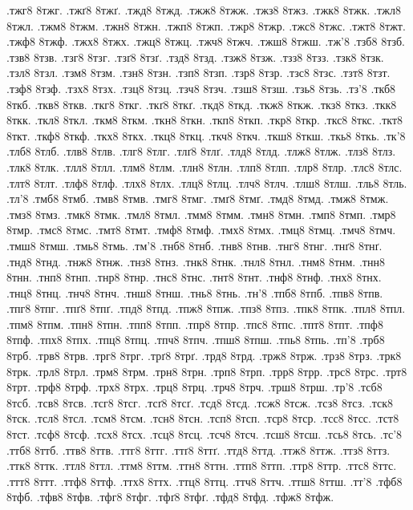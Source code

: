 {.тжг8 8тжг.
.тжґ8 8тжґ.
.тжд8 8тжд.
.тжж8 8тжж.
.тжз8 8тжз.
.тжк8 8тжк.
.тжл8 8тжл.
.тжм8 8тжм.
.тжн8 8тжн.
.тжп8 8тжп.
.тжр8 8тжр.
.тжс8 8тжс.
.тжт8 8тжт.
.тжф8 8тжф.
.тжх8 8тжх.
.тжц8 8тжц.
.тжч8 8тжч.
.тжш8 8тжш.
.тж'8
.тзб8 8тзб.
.тзв8 8тзв.
.тзг8 8тзг.
.тзґ8 8тзґ.
.тзд8 8тзд.
.тзж8 8тзж.
.тзз8 8тзз.
.тзк8 8тзк.
.тзл8 8тзл.
.тзм8 8тзм.
.тзн8 8тзн.
.тзп8 8тзп.
.тзр8 8тзр.
.тзс8 8тзс.
.тзт8 8тзт.
.тзф8 8тзф.
.тзх8 8тзх.
.тзц8 8тзц.
.тзч8 8тзч.
.тзш8 8тзш.
.тзь8 8тзь.
.тз'8
.ткб8 8ткб.
.ткв8 8ткв.
.ткг8 8ткг.
.ткґ8 8ткґ.
.ткд8 8ткд.
.ткж8 8ткж.
.ткз8 8ткз.
.ткк8 8ткк.
.ткл8 8ткл.
.ткм8 8ткм.
.ткн8 8ткн.
.ткп8 8ткп.
.ткр8 8ткр.
.ткс8 8ткс.
.ткт8 8ткт.
.ткф8 8ткф.
.ткх8 8ткх.
.ткц8 8ткц.
.ткч8 8ткч.
.ткш8 8ткш.
.ткь8 8ткь.
.тк'8
.тлб8 8тлб.
.тлв8 8тлв.
.тлг8 8тлг.
.тлґ8 8тлґ.
.тлд8 8тлд.
.тлж8 8тлж.
.тлз8 8тлз.
.тлк8 8тлк.
.тлл8 8тлл.
.тлм8 8тлм.
.тлн8 8тлн.
.тлп8 8тлп.
.тлр8 8тлр.
.тлс8 8тлс.
.тлт8 8тлт.
.тлф8 8тлф.
.тлх8 8тлх.
.тлц8 8тлц.
.тлч8 8тлч.
.тлш8 8тлш.
.тль8 8тль.
.тл'8
.тмб8 8тмб.
.тмв8 8тмв.
.тмг8 8тмг.
.тмґ8 8тмґ.
.тмд8 8тмд.
.тмж8 8тмж.
.тмз8 8тмз.
.тмк8 8тмк.
.тмл8 8тмл.
.тмм8 8тмм.
.тмн8 8тмн.
.тмп8 8тмп.
.тмр8 8тмр.
.тмс8 8тмс.
.тмт8 8тмт.
.тмф8 8тмф.
.тмх8 8тмх.
.тмц8 8тмц.
.тмч8 8тмч.
.тмш8 8тмш.
.тмь8 8тмь.
.тм'8
.тнб8 8тнб.
.тнв8 8тнв.
.тнг8 8тнг.
.тнґ8 8тнґ.
.тнд8 8тнд.
.тнж8 8тнж.
.тнз8 8тнз.
.тнк8 8тнк.
.тнл8 8тнл.
.тнм8 8тнм.
.тнн8 8тнн.
.тнп8 8тнп.
.тнр8 8тнр.
.тнс8 8тнс.
.тнт8 8тнт.
.тнф8 8тнф.
.тнх8 8тнх.
.тнц8 8тнц.
.тнч8 8тнч.
.тнш8 8тнш.
.тнь8 8тнь.
.тн'8
.тпб8 8тпб.
.тпв8 8тпв.
.тпг8 8тпг.
.тпґ8 8тпґ.
.тпд8 8тпд.
.тпж8 8тпж.
.тпз8 8тпз.
.тпк8 8тпк.
.тпл8 8тпл.
.тпм8 8тпм.
.тпн8 8тпн.
.тпп8 8тпп.
.тпр8 8тпр.
.тпс8 8тпс.
.тпт8 8тпт.
.тпф8 8тпф.
.тпх8 8тпх.
.тпц8 8тпц.
.тпч8 8тпч.
.тпш8 8тпш.
.тпь8 8тпь.
.тп'8
.трб8 8трб.
.трв8 8трв.
.трг8 8трг.
.трґ8 8трґ.
.трд8 8трд.
.трж8 8трж.
.трз8 8трз.
.трк8 8трк.
.трл8 8трл.
.трм8 8трм.
.трн8 8трн.
.трп8 8трп.
.трр8 8трр.
.трс8 8трс.
.трт8 8трт.
.трф8 8трф.
.трх8 8трх.
.трц8 8трц.
.трч8 8трч.
.трш8 8трш.
.тр'8
.тсб8 8тсб.
.тсв8 8тсв.
.тсг8 8тсг.
.тсґ8 8тсґ.
.тсд8 8тсд.
.тсж8 8тсж.
.тсз8 8тсз.
.тск8 8тск.
.тсл8 8тсл.
.тсм8 8тсм.
.тсн8 8тсн.
.тсп8 8тсп.
.тср8 8тср.
.тсс8 8тсс.
.тст8 8тст.
.тсф8 8тсф.
.тсх8 8тсх.
.тсц8 8тсц.
.тсч8 8тсч.
.тсш8 8тсш.
.тсь8 8тсь.
.тс'8
.ттб8 8ттб.
.ттв8 8ттв.
.ттг8 8ттг.
.ттґ8 8ттґ.
.ттд8 8ттд.
.ттж8 8ттж.
.ттз8 8ттз.
.ттк8 8ттк.
.ттл8 8ттл.
.ттм8 8ттм.
.ттн8 8ттн.
.ттп8 8ттп.
.ттр8 8ттр.
.ттс8 8ттс.
.ттт8 8ттт.
.ттф8 8ттф.
.ттх8 8ттх.
.ттц8 8ттц.
.ттч8 8ттч.
.ттш8 8ттш.
.тт'8
.тфб8 8тфб.
.тфв8 8тфв.
.тфг8 8тфг.
.тфґ8 8тфґ.
.тфд8 8тфд.
.тфж8 8тфж.
}
